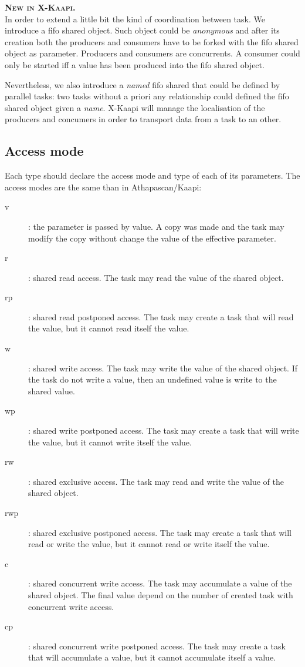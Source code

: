 \documentclass{report}
\newcommand{\kaapi}{\textsc{X}-Kaapi\xspace}
\newcommand{\new}{\hspace*{10ex}\textbf{\textsc{New in \kaapi.}~\\}\xspace}
\begin{document}
\new
In order to extend a little bit the kind of coordination between task. We introduce a fifo shared object. Such object could be \textit{anonymous} and after its creation both the producers and consumers have to be forked with the fifo shared object as parameter. Producers and consumers are concurrents. A consumer could only be started iff a value has been produced into the fifo shared object.

Nevertheless, we also introduce a \textit{named} fifo shared that could be defined by parallel tasks: two tasks without a priori any relationship could defined the fifo shared object given a \textit{name}. \kaapi will manage the localisation of the producers and concumers in order to transport data from a task to an other.



\subsection{Access mode}
Each type should declare the access mode and type of each of its parameters. The access modes are the same than in Athapascan/Kaapi:
\begin{description}
\item [v]: the parameter is passed by value. A copy was made and the task may modify the copy without change the value of the effective parameter.
\item [r]: shared read access. The task may read the value of the shared object.
\item [rp]: shared read postponed access. The task may create a task that will read the value, but it cannot read itself the value.
\item [w]: shared write access. The task may write the value of the shared object. If the task do not write a value, then an undefined value is write to the shared value.
\item [wp]: shared write postponed access. The task may create a task that will write the value, but it cannot write itself the value.
\item [rw]: shared exclusive access. The task may read and write the value of the shared object.
\item [rwp]: shared exclusive postponed access. The task may create a task that will read or write the value, but it cannot read or write itself the value.
\item [c]: shared concurrent write access. The task may accumulate a value of the shared object. The final value depend on the number of created task with concurrent write access.
\item [cp]: shared concurrent write postponed access. The task may create a task that will accumulate a value, but it cannot accumulate itself a value.
\end{description}
\end{document}
